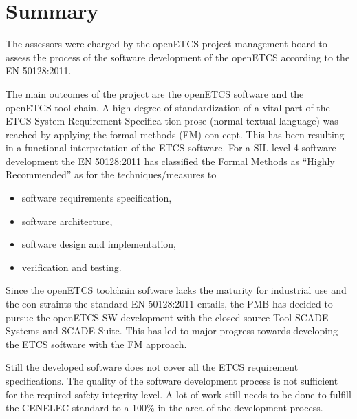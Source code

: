 \section{Summary}

\bigskip
The assessors were charged by the openETCS project management board to assess the process of the software development of the openETCS according to the EN 50128:2011.

The main outcomes of the project are the openETCS software and the openETCS tool chain. A high degree of standardization of a vital part of the ETCS System Requirement Specifica-tion prose (normal textual language) was reached by applying the formal methods (FM) con-cept. This has been resulting in a functional interpretation of the ETCS software. For a SIL level 4 software development the EN 50128:2011 has classified the Formal Methods as “Highly Recommended” as for the techniques/measures to
\begin{itemize}
\item	software requirements specification,
\item	software architecture,
\item	software design and implementation,
\item	verification and testing.
\end{itemize}

Since the openETCS toolchain software lacks the maturity for industrial use and the con-straints the standard EN 50128:2011 entails, the PMB has decided to pursue the openETCS SW development with the closed source Tool SCADE Systems and SCADE Suite. This has led to major progress towards developing the ETCS software with the FM approach.

Still the developed software does not cover all the ETCS requirement specifications. The quality of the software development process is not sufficient for the required safety integrity level. A lot of work still needs to be done to fulfill the CENELEC standard to a 100\% in the area of the development process.
